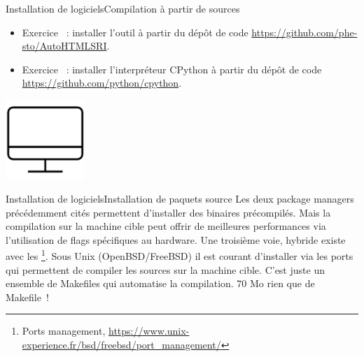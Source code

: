 \documentclass{beamer}
\begin{document}
    \begin{frame}{Installation de logiciels}{Compilation à partir de sources}
        \begin{itemize}
            \item Exercice \execcounterdispinc{}~: installer l'outil à partir du dépôt de code \url{https://github.com/phe-sto/AutoHTMLSRI}.
            \item Exercice \execcounterdispinc{}~: installer l'interpréteur CPython à partir du dépôt de code \url{https://github.com/python/cpython}.
        \end{itemize}
        \bigbreak
        \centering
        \includegraphics[width=3cm]{image/desktop}
    \end{frame}

    \begin{frame}{Installation de logiciels}{Installation de paquets source}
        Les deux package managers précédemment cités permettent d'installer des binaires précompilés.
        Mais la compilation sur la machine cible peut offrir de meilleures performances via l'utilisation de flags spécifiques au hardware.
        \bigbreak
        Une troisième voie, hybride existe avec les \footnote{Ports management, \url{https://www.unix-experience.fr/bsd/freebsd/port_management/}}.
        Sous Unix (OpenBSD/FreeBSD) il est courant d'installer via les ports qui permettent de compiler les sources sur la machine cible.
        C'est juste un ensemble de Makefiles qui automatise la compilation.
        70 Mo rien que de Makefile~!
    \end{frame}
\end{document}
